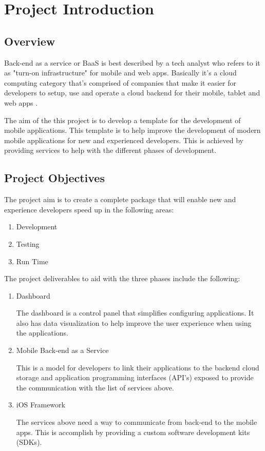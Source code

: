 \chapter{Project Introduction}

\section{Overview}

Back-end as a service or BaaS is best described by a tech analyst who refers to it as "turn-on infrastructure" for mobile and web apps. Basically it's a cloud computing category that's comprised of companies that make it easier for developers to setup, use and operate a cloud backend for their mobile, tablet and web apps \cite{kinveywebsite}. 

The aim of the this project is to develop a template for the development of mobile applications. This template is to help improve the development of modern mobile applications for new and experienced developers. This is achieved by providing services to help with the different phases of development. 


\section{Project Objectives}

The project aim is to create a complete package that will enable new and experience developers speed up in the following areas:

\begin{enumerate}
  \item Development
  \item Testing 
  \item Run Time
\end{enumerate}

The project deliverables to aid with the three phases include the following:

\begin{enumerate}
  \item Dashboard
  
    The dashboard is a control panel that simplifies configuring applications. It also has data visualization to help improve the user experience when using the applications.
  \item Mobile Back-end as a Service
  
    This is a model for developers to link their applications to the backend cloud storage and application programming interfaces (API's) exposed to provide the communication with the list of services above.
  \item iOS Framework
  
    The services above need a way to communicate from back-end to the mobile apps. This is accomplish by providing a custom software development kits (SDKs).
\end{enumerate}

